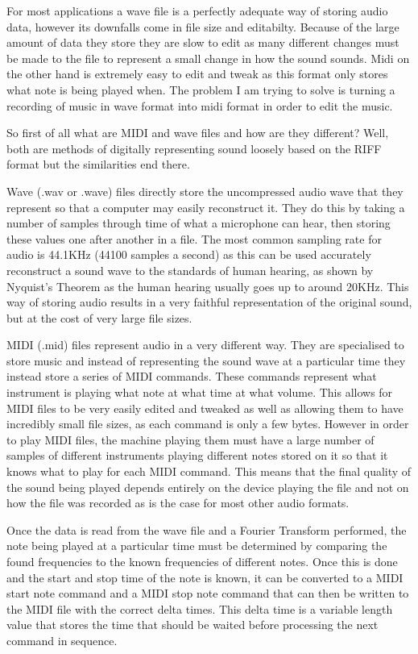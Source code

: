 \documentclass[12pt]{report}
\begin{document}
For most applications a wave file is a perfectly adequate way of storing audio data, however its downfalls come in file size and editabilty. Because of the large amount of data they store they are slow to edit as many different changes must be made to the file to represent a small change in how the sound sounds. Midi on the other hand is extremely easy to edit and tweak as this format only stores what note is being played when. The problem I am trying to solve is turning a recording of music in wave format into midi format in order to edit the music.

So first of all what are MIDI and wave files and how are they different? Well, both are methods of digitally representing sound loosely based on the RIFF format but the similarities end there. 

Wave (.wav or .wave) files directly store the uncompressed audio wave that they represent so that a computer may easily reconstruct it. They do this by taking a number of samples through time of what a microphone can hear, then storing these values one after another in a file. The most common sampling rate for audio is 44.1KHz (44100 samples a second) as this can be used accurately reconstruct a sound wave to the standards of human hearing, as shown by Nyquist's Theorem as the human hearing usually goes up to around 20KHz. This way of storing audio results in a very faithful representation of the original sound, but at the cost of very large file sizes.

MIDI (.mid) files represent audio in a very different way. They are specialised to store music and instead of representing the sound wave at a particular time they instead store a series of MIDI commands. These commands represent what instrument is playing what note at what time at what volume. This allows for MIDI files to be very easily edited and tweaked as well as allowing them to have incredibly small file sizes, as each command is only a few bytes. However in order to play MIDI files, the machine playing them must have a large number of samples of different instruments playing different notes stored on it so that it knows what to play for each MIDI command. This means that the final quality of the sound being played depends entirely on the device playing the file and not on how the file was recorded as is the case for most other audio formats.

Once the data is read from the wave file and a Fourier Transform performed, the note being played at a particular time must be determined by comparing the found frequencies to the known frequencies of different notes. Once this is done and the start and stop time of the note is known, it can be converted to a MIDI start note command and a MIDI stop note command that can then be written to the MIDI file with the correct delta times. This delta time is a variable length value that stores the time that should be waited before processing the next command in sequence.
\end{document}
